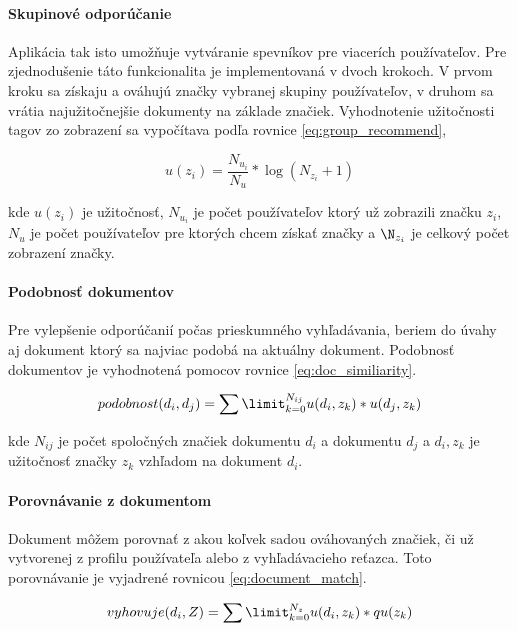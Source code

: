 \paragraph{Skupinové odporúčanie}

Aplikácia tak isto umožňuje vytváranie spevníkov pre viacerích používateľov. Pre zjednodušenie
táto funkcionalita je implementovaná v dvoch krokoch. V prvom kroku sa získaju a ováhujú značky
vybranej skupiny používateľov, v druhom sa vrátia najužitočnejšie dokumenty na základe značiek.
Vyhodnotenie užitočnosti tagov zo zobrazení sa vypočítava podľa rovnice \ref{eq:group_recommend},

\begin{equation}\label{eq:group_recommend}
u(z_i) = \frac{N_{u_i}}{N_u} * \log (N_{z_i} + 1)
\end{equation}

kde \(u(z_i)\) je užitočnosť, \(N_{u_i}\) je počet používateľov ktorý už zobrazili značku
\(z_i\), \(N_u\) je počet používateľov pre ktorých chcem získať značky a \(\N_{z_i}\) je 
celkový počet zobrazení značky.

\paragraph{Podobnosť dokumentov}

Pre vylepšenie odporúčanií počas prieskumného vyhľadávania, beriem do úvahy aj dokument ktorý
sa najviac podobá na aktuálny dokument. Podobnosť dokumentov je vyhodnotená pomocov rovnice
\ref{eq:doc_similiarity}.

\begin{equation}\label{eq:doc_similiarity}
podobnost(d_i, d_j) = \sum\limit_{k = 0}^{N_{ij}} u(d_i, z_k) * u(d_j, z_k)
\end{equation}

kde \(N_{ij}\) je počet spoločných značiek dokumentu \(d_i\) a dokumentu \(d_j\) a 
\(d_i, z_k\) je užitočnosť značky \(z_k\) vzhľadom na dokument \(d_i\).

\paragraph{Porovnávanie z dokumentom}

Dokument môžem porovnať z akou koľvek sadou ováhovaných značiek, či už vytvorenej z profilu 
používateľa alebo z vyhľadávacieho reťazca. Toto porovnávanie je vyjadrené rovnicou
\ref{eq:document_match}.

\begin{equation}\label{eq:document_match}
vyhovuje(d_i, Z) = \sum\limit_{k = 0}^{N_{z}} u(d_i, z_k) * qu(z_k)
\end{equation}

